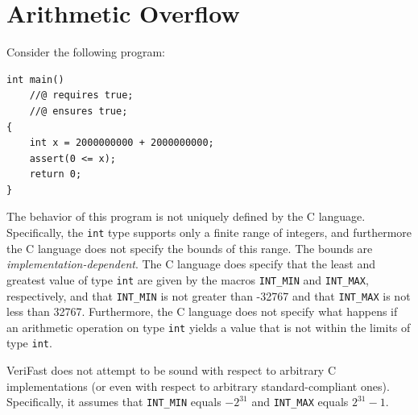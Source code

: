 \documentclass{article}
\begin{document}
\section{Arithmetic Overflow}

Consider the following program:
\begin{lstlisting}
int main()
    //@ requires true;
    //@ ensures true;
{
    int x = 2000000000 + 2000000000;
    assert(0 <= x);
    return 0;
}
\end{lstlisting}
The behavior of this program is not uniquely defined by the C
language. Specifically, the \lstinline!int! type supports only
a finite range of integers, and furthermore the C language does
not specify the bounds of this range. The bounds are
\emph{implementation-dependent}. The C language does specify
that the least and greatest value of type \lstinline!int! are
given by the macros \lstinline!INT_MIN! and
\lstinline!INT_MAX!, respectively, and that \lstinline!INT_MIN!
is not greater than -32767 and that \lstinline!INT_MAX! is not
less than 32767. Furthermore, the C language does not specify
what happens if an arithmetic operation on type \lstinline!int!
yields a value that is not within the limits of type
\lstinline!int!.

VeriFast does not attempt to be sound with respect to arbitrary
C implementations (or even with respect to arbitrary
standard-compliant ones). Specifically, it assumes that
\lstinline!INT_MIN! equals $-2^{31}$ and \lstinline!INT_MAX!
equals $2^{31}-1$.
\end{document}
